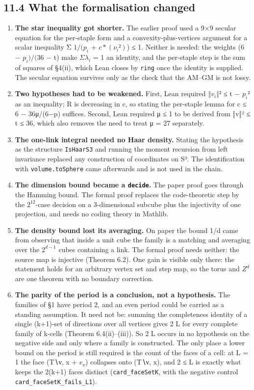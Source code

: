 \documentclass[11pt,a4paper]{article}
\theoremstyle{named}
\begin{document}
\subsection*{11.4 What the formalisation changed}
\begin{enumerate}
\item[1.] \textbf{The star inequality got shorter.} The earlier proof used a 9×9 secular equation for the per-staple form and a convexity-plus-vertices argument for a scalar inequality Σ $1/(p_i$ + $c*(ν_i²)$) ≤ 1. Neither is needed: the weights (6 − $p_i)/(36$ − t) make $Σλ_i$ = 1 an identity, and the per-staple step is the sum of squares of §4(ii), which Lean closes by \texttt{ring} once the identity is supplied. The secular equation survives only as the check that the AM–GM is not lossy.
\item[2.] \textbf{Two hypotheses had to be weakened.} First, Lean required $‖v_i‖²$ ≤ t − $p_i²$ as an inequality; R is decreasing in c, so stating the per-staple lemma for c ≤ 6 − 36μ/(6−p) suffices. Second, Lean required μ ≤ 1 to be derived from ‖v‖² ≤ t ≤ 36, which also removes the need to treat μ = 27 separately.
\item[3.] \textbf{The one-link integral needed no Haar density.} Stating the hypothesis as the structure \texttt{IsHaarS3} and running the moment recursion from left invariance replaced any construction of coordinates on S³. The identification with \texttt{volume.\allowbreak{}toSphere} came afterwards and is not used in the chain.
\item[4.] \textbf{The dimension bound became a \texttt{decide}.} The paper proof goes through the Hamming bound. The formal proof replaces the code-theoretic step by the $2^{12}$-case decision on a 3-dimensional subcube plus the injectivity of one projection, and needs no coding theory in Mathlib.
\item[5.] \textbf{The density bound lost its averaging.} On paper the bound 1/d came from observing that inside a unit cube the family is a matching and averaging over the $2^{d−1}$ cubes containing a link. The formal proof needs neither: the source map is injective (Theorem 6.2). One gain is visible only there: the statement holds for an arbitrary vertex set and step map, so the torus and $Z^d$ are one theorem with no boundary correction.
\item[6.] \textbf{The parity of the period is a conclusion, not a hypothesis.} The families of §1 have period 2, and an even period could be carried as a standing assumption. It need not be: summing the completeness identity of a single (k+1)-set of directions over all vertices gives 2 \textbar{} L for every complete family of k-cells (Theorem 6.4(ii)–(iii)). So 2 \textbar{} L occurs in no hypothesis on the negative side and only where a family is constructed. The only place a lower bound on the period is still required is the count of the faces of a cell: at L = 1 the face (T∖ν, x + $e_{ν}$) collapses onto (T∖ν, x), and 2 ≤ L is exactly what keeps the 2(k+1) faces distinct (\texttt{card\_\allowbreak{}faceSetK}, with the negative control \texttt{card\_\allowbreak{}faceSetK\_\allowbreak{}fails\_\allowbreak{}L1}).

\end{enumerate}
\end{document}
